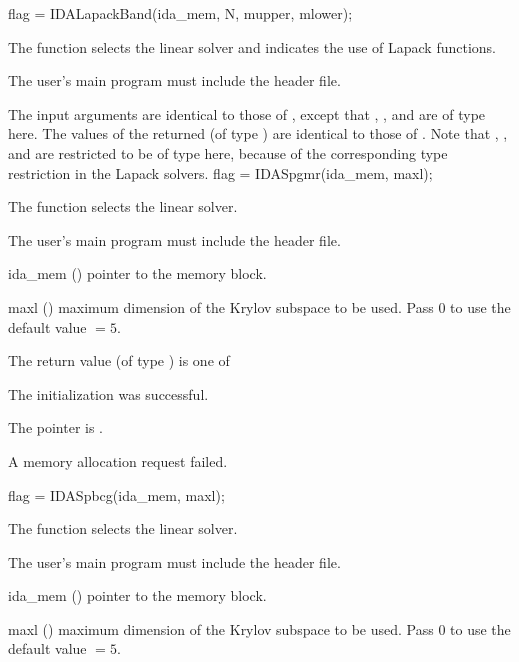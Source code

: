 {
  flag = IDALapackBand(ida\_mem, N, mupper, mlower);
}
{
  The function  selects the {\idaband} linear solver and
  indicates the use of Lapack functions. 

  The user's main program must include the  header file.
}
{
  The input arguments are identical to those of , except
  that , , and  are of type  here.
}
{
  The values of the returned  (of type ) are identical
  to those of .
}
{
  Note that , , and  are restricted to be of type 
  here, because of the corresponding type restriction in the Lapack solvers.
}
{
  flag = IDASpgmr(ida\_mem, maxl);
}
{
  The function  selects the {\idaspgmr} linear solver. 

  The user's main program must include the  header file.
}
{
  \begin{args}
  \item[ida\_mem] ()
    pointer to the {\ida} memory block.
  \item[maxl] ()
    maximum dimension of the Krylov subspace to be used. Pass $0$ to use the 
    default value $=5$.
  \end{args}
}
{
  The return value  (of type ) is one of
  \begin{args}
  \item[\Id{IDASPILS\_SUCCESS}] 
    The {\idaspgmr} initialization was successful.
  \item[\Id{IDASPILS\_MEM\_NULL}]
    The  pointer is .
  \item[\Id{IDASPILS\_MEM\_FAIL}]
    A memory allocation request failed.
  \end{args}
}
{}
{
  flag = IDASpbcg(ida\_mem, maxl);
}
{
  The function  selects the {\idaspbcg} linear solver. 

  The user's main program must include the  header file.
}
{
  \begin{args}
  \item[ida\_mem] ()
    pointer to the {\ida} memory block.
  \item[maxl] ()
    maximum dimension of the Krylov subspace to be used. Pass $0$ to use the 
    default value $=5$.
  \end{args}
}
